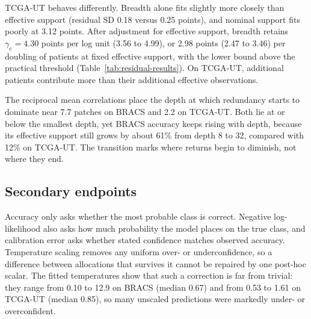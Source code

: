 \begin{table}[htbp]
\centering\small

\caption{Adjusting for redundancy removes the residual breadth effect on BRACS but leaves a substantial one on TCGA-UT. Entries are residual breadth coefficients $\gamma$ from $A=\alpha+\beta\log(\cdot)+\gamma\log G$, in points per natural log unit with paired 95\% intervals; the support slope is refitted jointly, and residual SD uses six residual degrees of freedom. A coefficient of 1.44 corresponds to one point per doubling of breadth.}
\label{tab:residual-results}
\end{table}

\noindent TCGA-UT behaves differently. Breadth alone fits slightly more closely than effective support (residual SD 0.18 versus 0.25 points), and nominal support fits poorly at 3.12 points. After adjustment for effective support, breadth retains $\gamma_e=4.30$ points per log unit (3.56 to 4.99), or 2.98 points (2.47 to 3.46) per doubling of patients at fixed effective support, with the lower bound above the practical threshold (Table~\ref{tab:residual-results}). On TCGA-UT, additional patients contribute more than their additional effective observations.

The reciprocal mean correlations place the depth at which redundancy starts to dominate near 7.7 patches on BRACS and 2.2 on TCGA-UT. Both lie at or below the smallest depth, yet BRACS accuracy keeps rising with depth, because its effective support still grows by about 61\% from depth 8 to 32, compared with 12\% on TCGA-UT. The transition marks where returns begin to diminish, not where they end.

\subsection{Secondary endpoints}
Accuracy only asks whether the most probable class is correct. Negative log-likelihood also asks how much probability the model places on the true class, and calibration error asks whether stated confidence matches observed accuracy. Temperature scaling removes any uniform over- or underconfidence, so a difference between allocations that survives it cannot be repaired by one post-hoc scalar. The fitted temperatures show that such a correction is far from trivial: they range from 0.10 to 12.9 on BRACS (median 0.67) and from 0.53 to 1.61 on TCGA-UT (median 0.85), so many unscaled predictions were markedly under- or overconfident.

